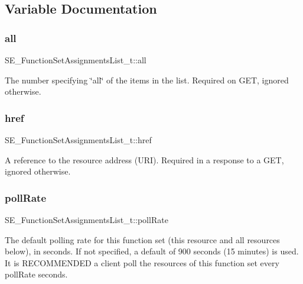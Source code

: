 \subsection{Variable Documentation}
\mbox{\label{group__FunctionSetAssignmentsList_gaa3cb8c5a55ac18b63bd2582417f168e0}} 
\subsubsection{\texorpdfstring{all}{all}}
{\footnotesize\ttfamily S\+E\+\_\+\+Function\+Set\+Assignments\+List\+\_\+t\+::all}

The number specifying \char`\"{}all\char`\"{} of the items in the list. Required on G\+ET, ignored otherwise. \mbox{\label{group__FunctionSetAssignmentsList_ga68247d187c62acc81cce9a7d85ad209b}} 
\subsubsection{\texorpdfstring{href}{href}}
{\footnotesize\ttfamily S\+E\+\_\+\+Function\+Set\+Assignments\+List\+\_\+t\+::href}

A reference to the resource address (U\+RI). Required in a response to a G\+ET, ignored otherwise. \mbox{\label{group__FunctionSetAssignmentsList_gab2f324d046132de9d38914b6d93d2155}} 
\subsubsection{\texorpdfstring{poll\+Rate}{pollRate}}
{\footnotesize\ttfamily S\+E\+\_\+\+Function\+Set\+Assignments\+List\+\_\+t\+::poll\+Rate}

The default polling rate for this function set (this resource and all resources below), in seconds. If not specified, a default of 900 seconds (15 minutes) is used. It is R\+E\+C\+O\+M\+M\+E\+N\+D\+ED a client poll the resources of this function set every poll\+Rate seconds. \mbox{\label{group__FunctionSetAssignmentsList_ga38dcb9244c2fd218072dcfa083d510d8}} 
